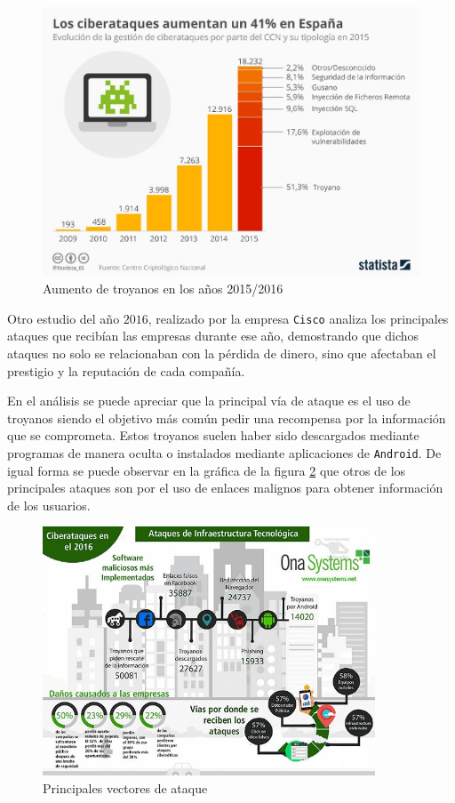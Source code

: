 \documentclass[12pt]{article}
\newcommand{\newpar} {
    \vskip 0.5cm
}
\begin{document}
            \begin{figure}
                \centering
                \includegraphics[width=0.5\linewidth]{cyber_threats.png}
                \caption{Aumento de troyanos en los años 2015/2016}
                \label{f:cyber_threats}
            \end{figure}

            Otro estudio del año $2016$, realizado por la empresa \texttt{Cisco} analiza los principales ataques que recibían las empresas durante ese año, demostrando que dichos ataques no solo se relacionaban con la pérdida de dinero, sino que afectaban el prestigio y la reputación de cada compañía.

            \newpar

            En el análisis se puede apreciar que la principal vía de ataque es el uso de troyanos siendo el objetivo más común pedir una recompensa por la información que se comprometa. Estos troyanos suelen haber sido descargados mediante programas de manera oculta o instalados mediante aplicaciones de \texttt{Android}. De igual forma se puede observar en la gráfica de la figura \ref{f:atk_vec} que otros de los principales ataques son por el uso de enlaces malignos para obtener información de los usuarios.

            \begin{figure}
                \centering
                \includegraphics[width=0.5\linewidth]{atk_vec.png}
                \caption{Principales vectores de ataque}
                \label{f:atk_vec}
            \end{figure}
\end{document}
